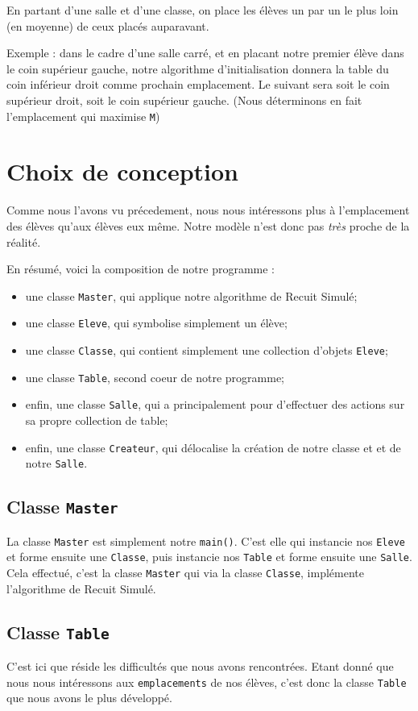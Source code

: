 \documentclass[11pt,a4paper, openany]{book}
\begin{document}
En partant d'une salle et d'une classe, on place les élèves un par un le plus loin (en moyenne) de ceux placés auparavant.

Exemple : dans le cadre d'une salle carré, et en placant notre premier élève dans le coin supérieur gauche, notre algorithme d'initialisation donnera la table du coin inférieur droit comme prochain emplacement.
Le suivant sera soit le coin supérieur droit, soit le coin supérieur gauche.
(Nous déterminons en fait l'emplacement qui maximise \texttt{M})

\section{Choix de conception}

Comme nous l'avons vu précedement, nous nous intéressons plus à l'emplacement des élèves qu'aux élèves eux même. Notre modèle n'est donc pas \textit{très} proche de la réalité.

En résumé, voici la composition de notre programme :
\begin{itemize}
\item une classe \texttt{Master}, qui applique notre algorithme de Recuit Simulé;
\item une classe \texttt{Eleve}, qui symbolise simplement un élève;
\item une classe \texttt{Classe}, qui contient simplement une collection d'objets \texttt{Eleve};
\item une classe \texttt{Table}, second coeur de notre programme;
\item enfin, une classe \texttt{Salle}, qui a principalement pour d'effectuer des actions sur sa propre collection de table;
\item enfin, une classe \texttt{Createur}, qui délocalise la création de notre classe et et de notre \texttt{Salle}.
\end{itemize}

\subsection{Classe \texttt{Master}}
La classe \texttt{Master} est simplement notre \texttt{main()}. C'est elle qui instancie nos \texttt{Eleve} et forme ensuite une \texttt{Classe}, puis instancie nos \texttt{Table} et forme ensuite une \texttt{Salle}.
Cela effectué, c'est la classe \texttt{Master} qui via la classe \texttt{Classe}, implémente l'algorithme de Recuit Simulé.

\subsection{Classe \texttt{Table}}
C'est ici que réside les difficultés que nous avons rencontrées. Etant donné que nous nous intéressons aux \texttt{emplacements} de nos élèves, c'est donc la classe \texttt{Table} que nous avons le plus développé.
\end{document}
